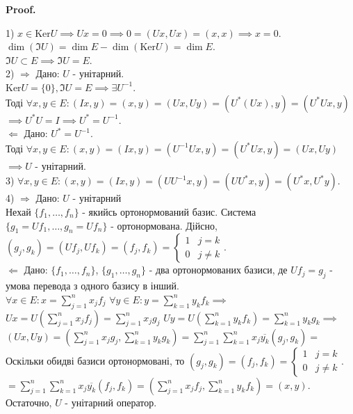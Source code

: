 \documentclass[a4paper, 10pt]{article}
\makeatletter
\def\huge{\displaystyle}
\def\rm#1{\textbf{Remark {#1}}}
\def\qed{$\blacksquare$}
\def\ker#1{\textrm{Ker} {#1}}
\def\rightproof{$\boxed{\Rightarrow}$ }
\def\leftproof{$\boxed{\Leftarrow}$ }
\theoremstyle{theoremdd}
\theoremstyle{theoremdd}
\theoremstyle{theoremdd}
\theoremstyle{theoremdd}
\theoremstyle{theoremdd}
\theoremstyle{theoremdd}
\theoremstyle{theoremdd}
\theoremstyle{theoremdd}
\renewenvironment{proof}[1][Proof.\\]{\par
\pushQED{\hfill \qed}%
\normalfont \topsep6\p@\@plus6\p@\relax
\trivlist
\item\relax
{\bfseries
#1\@addpunct{.}}\hspace\labelsep\ignorespaces
}{%
\popQED\endtrivlist\@endpefalse
}
\makeatother
\begin{document}
\begin{proof}
1) $x \in \ker U \implies Ux = 0 \implies 0 = (Ux, Ux) = (x,x) \implies x = 0$.\\
$\dim(\Im U) = \dim E - \dim(\ker U) = \dim E$.\\
$\Im U \subset E \implies \Im U = E$.
\bigskip \\
\iffalse
\rm{5.7.2.} У випадку дійсного евклідового простору унітарний оператор ще називають ортогонаьним
\bigskip \\
\fi
2) \rightproof Дано: $U$ - унітарний.\\
$\ker U = \{0\}, \Im U = E \implies \exists U^{-1}$.\\
Тоді $\forall x,y \in E: (Ix,y) = (x,y) = (Ux,Uy) = (U^*(Ux), y) = (U^*Ux,y)$\\
$\implies U^* U = I \implies U^* = U^{-1}$.
\bigskip \\
\leftproof Дано: $U^* = U^{-1}$.\\
Тоді $\forall x,y \in E: (x,y) = (Ix, y) = (U^{-1}Ux, y) = (U^*Ux,y) = (Ux, Uy)$\\
$\implies U$ - унітарний.
\bigskip \\
3) $\forall x,y \in E: (x,y) = (Ix,y) = (UU^{-1}x,y) = (UU^* x,y) = (U^*x,U^*y)$.
\bigskip \\
4) \rightproof Дано: $U$ - унітарний\\
Нехай $\{f_1,\dots,f_n\}$ - якийсь ортонормований базис. Система $\{g_1 = Uf_1, \dots, g_n = Uf_n\}$ - ортонормована. Дійсно,\\
$(g_j,g_k) = (Uf_j, Uf_k) = (f_j,f_k) = \begin{cases} 1 & j = k \\ 0 & j \neq k \end{cases}$.
\bigskip \\
\leftproof Дано: $\{f_1,\dots,f_n\}$, $\{g_1,\dots,g_n\}$ - два ортонормованих базиси, де $Uf_j = g_j$ - умова перевода з одного базису в інший.\\
$\forall x \in E: x = \huge \sum_{j=1}^n x_j f_j$
\hspace{2.3cm}
$\forall y \in E: y = \huge \sum_{k=1}^n y_k f_k \implies$\\
$Ux = \huge U\left(\sum_{j=1}^n x_j f_j \right) = \sum_{j=1}^n x_j g_j$
\hspace{0.8cm}
$Uy = \huge U\left(\sum_{k=1}^n y_k f_k \right) = \sum_{k=1}^n y_k g_k \implies$\\
$\huge (Ux, Uy) = \left(\sum_{j=1}^n x_j g_j, \sum_{k=1}^n y_k g_k \right) = \sum_{j=1}^n \sum_{k=1}^n x_j \overline{y_k} (g_j,g_k) \boxed{=}$\\
Оскільки обидві базиси ортонормовані, то $(g_j,g_k) = (f_j,f_k) = \begin{cases} 1 & j = k \\ 0 & j \neq k \end{cases}$.\\
$\boxed{=} \huge \sum_{j=1}^n \sum_{k=1}^n x_j \overline{y_k} (f_j,f_k) = \left(\sum_{j=1}^n x_jf_j, \sum_{k=1}^n y_k f_k \right) = (x,y)$.\\
Остаточно, $U$ - унітарний оператор.
\end{proof}
\end{document}
